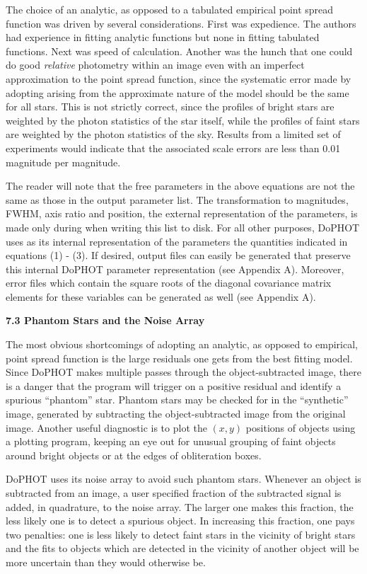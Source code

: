 The choice of an analytic, as opposed to a tabulated
empirical point spread function was driven by several
considerations.  First was expedience.  The authors had
experience in fitting analytic functions but none in fitting
tabulated functions.  Next was speed of calculation.
Another was the hunch that one could do good {\it relative}
photometry within an image even with an imperfect
approximation to the point spread function, since the
systematic error made by adopting arising from the
approximate nature of the model should be the same for all
stars.  This is not strictly correct, since the profiles of
bright stars are weighted by the photon statistics of the
star itself, while the profiles of faint stars are weighted
by the photon statistics of the sky.  Results from a limited
set of experiments would indicate that the associated scale
errors are less than 0.01 magnitude per magnitude.

The reader will note that the free parameters in the above
equations are not the same as those in the output parameter
list.  The transformation to magnitudes, FWHM, axis ratio
and position, the external representation of the parameters,
is made only during when writing this list to disk.  For all
other purposes, DoPHOT uses as its internal representation
of the parameters the quantities indicated in equations (1)
- (3).  If desired, output files can easily be generated that
preserve this internal DoPHOT parameter representation (see
Appendix A).  Moreover, error files which contain the square 
roots of the diagonal covariance matrix elements for these 
variables can be generated as well (see
Appendix A).

\centerline{\bf 7.3 Phantom Stars and the Noise Array}

The most obvious shortcomings of adopting an analytic,
as opposed to empirical, point spread function is
the large residuals one gets from the best fitting model.
Since DoPHOT makes multiple passes through the object-subtracted
image, there is a danger that the program will trigger
on a positive residual and identify a spurious ``phantom''
star.  Phantom stars may be checked for in the ``synthetic''
image, generated by subtracting the object-subtracted
image from the original image.  Another useful diagnostic
is to plot the $(x,y)$ positions of objects using a plotting
program, keeping an eye out for unusual grouping of faint
objects around bright objects or at the edges of obliteration boxes.

DoPHOT uses its noise array to avoid such phantom stars.
Whenever an object is subtracted from an image, a user
specified fraction of the subtracted signal is added, in
quadrature, to the noise array.  The larger one makes this
fraction, the less likely one is to detect a spurious
object.  In increasing this fraction, one pays two
penalties: one is less likely to detect faint stars in the
vicinity of bright stars and the fits to objects which are
detected in the vicinity of another object will be more
uncertain than they would otherwise be.


